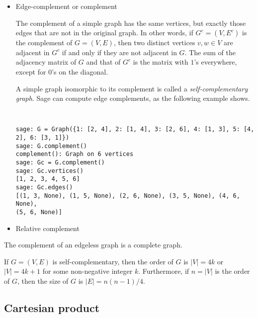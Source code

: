 \begin{itemize}
\item Edge-complement or complement

The complement of a simple graph has the same vertices, but exactly those
edges that are not in the original graph. In other words, if
$G^c = (V, E^c)$ is the complement of $G = (V,E)$, then two distinct
vertices $v,w \in V$ are adjacent in $G^c$ if and only if they are not
adjacent in $G$. The sum of the adjacency matrix of $G$ and that of
$G^c$ is the matrix with $1$'s everywhere, except for $0$'s on the
diagonal.

A simple graph isomorphic to its complement is called a
\emph{self-complementary graph}.
Sage can compute edge complements, as the following example shows.
%
\begin{center}
\fontsize{9pt}{9pt}
\selectfont
\tt
\begin{lstlisting}
sage: G = Graph({1: [2, 4], 2: [1, 4], 3: [2, 6], 4: [1, 3], 5: [4, 2], 6: [3, 1]})
sage: G.complement()
complement(): Graph on 6 vertices
sage: Gc = G.complement()
sage: Gc.vertices()
[1, 2, 3, 4, 5, 6]
sage: Gc.edges()
[(1, 3, None), (1, 5, None), (2, 6, None), (3, 5, None), (4, 6, None),
(5, 6, None)]
\end{lstlisting}
\end{center}

\item Relative complement
\end{itemize}

\begin{theorem}
The complement of an edgeless graph is a complete graph.
\end{theorem}

\begin{theorem}
If $G = (V, E)$ is self-complementary, then the order of $G$ is
$|V| = 4k$ or $|V| = 4k + 1$ for some non-negative integer
$k$. Furthermore, if $n = |V|$ is the order of $G$, then the size of
$G$ is $|E| = n(n - 1) / 4$.
\end{theorem}



\subsection{Cartesian product}

